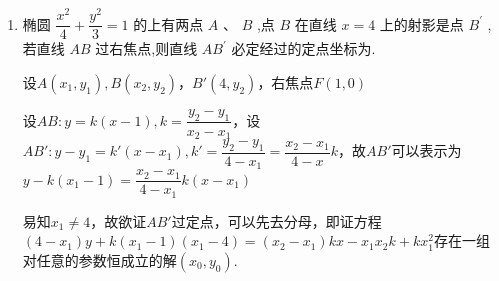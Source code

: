 \begin{enumerate}
        \begin{jieda}
            由 $\dfrac{{x}^{2}}{2} + {y}^{2} = 1$ 知 $a = \sqrt{2},b = 1,c = 1$ ,故右焦点为 $F\left( {1,0}\right)$，故右准线方程为 $x = \dfrac{{a}^{2}}{c} = 2$ ,点 $E$ 的坐标为 $\left( {2,0}\right) ,{EF}$ 的中点为 $N\left( {\dfrac{3}{2},0}\right)$
    
            易知直线$AB$的斜率不为0，因此可设$AB$为$x = my+1$，记 $A\left( {{x}_{1},{y}_{1}}\right) ,B\left( {{x}_{2},{y}_{2}}\right)$ ,则 $C\left( {2,{y}_{2}}\right)$
            
            联立直线与椭圆的方程 $\left\{  \begin{array}{l} x = my+1 \\  \dfrac{{x}^{2}}{2} + {y}^{2} = 1 \end{array}\right.$ ,则 $(my+1)^2 + 2y^2 = 2$，即$(2+m^2)y^2+2my-1 = 0$，易知$\Delta>0$
    
            根据韦达定理有$\left\{\begin{array}{l}
                 y_1+y_2 = \dfrac{-2m}{2+m^2} \\
                 y_1y_2 = -\dfrac{1}{2+m^2}
            \end{array}\right.$
    
            $\vv{NA} = \left(x_1-\dfrac{3}{2}, y_1\right) = \left(my_1-\dfrac{1}{2}, y_1\right)$，$\vv{NC} = \left(\dfrac{1}{2}, y_2\right)$，因为$\left(my_1-\dfrac{1}{2}\right)\cdot y_2 - \dfrac{1}{2}y_2 = my_1y_2 + \dfrac{y_1+y_2}{2} = 0$，所以$N,A,C$三点共线，即直线 ${AC}$ 经过线段 ${EF}$ 的中点.
        \end{jieda}

    \item 椭圆 $\dfrac{x^2}{4} + \dfrac{{y}^{2}}{3} = 1$ 的上有两点 $A\text{ 、 }B$ ,点 $B$ 在直线 $x = 4$ 上的射影是点 ${B}^{\prime }$ ,若直线 ${AB}$ 过右焦点,则直线 $A{B}^{\prime }$ 必定经过的定点坐标为.
    \begin{jieda}
        设$A(x_1, y_1), B(x_2, y_2)， B'\left(4, y_2\right)$，右焦点$F(1, 0)$

        设$AB: y = k(x-1), k = \dfrac{y_2 - y_1}{x_2 - x_1}$，设$AB': y - y_1 = k'(x - x_1), k' = \dfrac{y_2-y_1}{4 - x_1} = \dfrac{x_2-x_1}{4 - x}k$，故$AB'$可以表示为$y - k(x_1-1) = \dfrac{x_2-x_1}{4 - x_1}k(x-x_1)$

        易知$x_1 \neq 4$，故欲证$AB'$过定点，可以先去分母，即证方程$\left(4 - x_1\right)y + k(x_1-1)\left(x_1-4\right) = (x_2 - x_1)kx -x_1x_2k + kx_1^2$存在一组对任意的参数恒成立的解$(x_0, y_0)$.


\end{jieda}
\end{enumerate}

